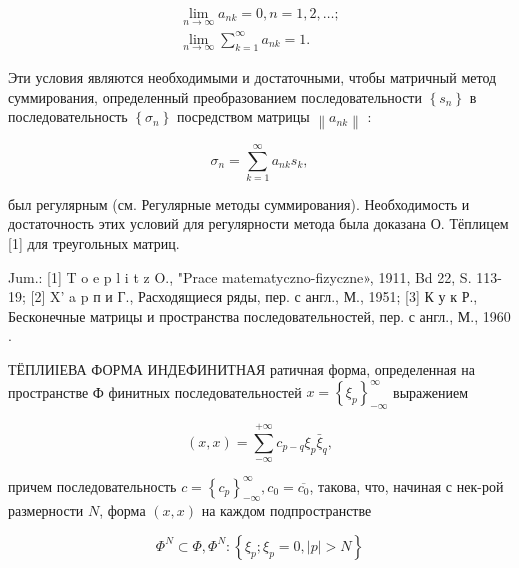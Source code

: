 \documentclass[10pt]{article}
\begin{document}
\[

\begin{gathered}

\lim _{n \rightarrow \infty} a_{n k}=0, n=1,2, \ldots ; \\

\lim _{n \rightarrow \infty} \sum_{k=1}^{\infty} a_{n k}=1 .

\end{gathered}

\]



Эти условия являются необходимыми и достаточными, чтобы матричный метод суммирования, определенный преобразованием последовательности $\left\{s_{n}\right\}$ в последовательность $\left\{\sigma_{n}\right\}$ посредством матрицы $\left\|a_{n k}\right\|$ :



\[

\sigma_{n}=\sum_{k=1}^{\infty} a_{n k} s_{k},

\]



был регулярным (см. Регулярные методы суммирования). Необходимость и достаточность этих условий для регулярности метода была доказана О. Тёплицем [1] для треугольных матриц.



Jum.: [1] T o e p l i t z O., "Prace matematyczno-fizyczne», 1911, Bd 22, S. 113-19; [2] X' a p п и Г., Расходящиеся ряды, пер. с англ., М., 1951; [3] К у к Р., Бесконечные матрицы и пространства последовательностей, пер. с англ., М., 1960 .



ТЁПЛИІЕВА ФОРМА ИНДЕФИНИТНАЯ ратичная форма, определенная на пространстве Ф финитных последовательностей $x=\left\{\xi_{p}\right\}_{-\infty}^{\infty}$ выражением



\[

(x, x)=\sum_{-\infty}^{+\infty} c_{p-q} \xi_{p} \bar{\xi}_{q},

\]



причем последовательность $c=\left\{c_{p}\right\}_{-\infty}^{\infty}, c_{0}=\overline{c_{0}}$, такова, что, начиная с нек-рой размерности $N$, форма $(x, x)$ на каждом подпространстве



\[

\Phi^{N} \subset \Phi, \Phi^{N}:\left\{\xi_{p} ; \xi_{p}=0,|p|>N\right\}

\]
\end{document}
